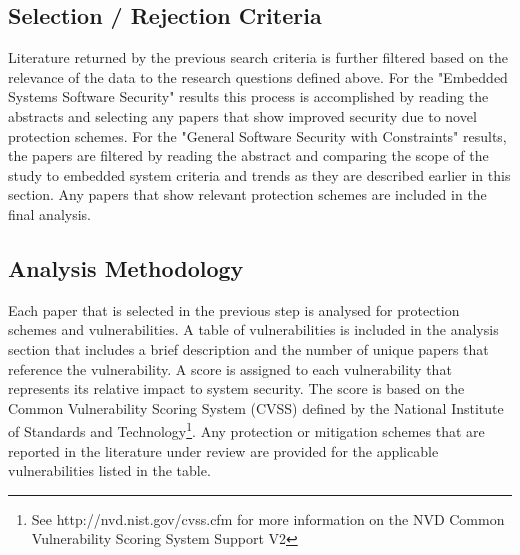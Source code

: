 \documentclass[final]{article}
\begin{document}
\subsection{Selection / Rejection Criteria}

Literature returned by the previous search criteria is further filtered based on the relevance of the data to the research questions defined above.  For the "Embedded Systems Software Security" results this process is accomplished by reading the abstracts and selecting any papers that show improved security due to novel protection schemes. For the "General Software Security with Constraints" results, the papers are filtered by reading the abstract and comparing the scope of the study to embedded system criteria and trends as they are described earlier in this section. Any papers that show relevant protection schemes are included in the final analysis.

\subsection{Analysis Methodology}

Each paper that is selected in the previous step is analysed for protection schemes and vulnerabilities.  A table of vulnerabilities is included in the analysis section that includes a brief description and the number of unique papers that reference the vulnerability. A score is assigned to each vulnerability that represents its relative impact to system security. The score is based on the Common Vulnerability Scoring System (CVSS) defined by the National Institute of Standards and Technology\footnote{See http://nvd.nist.gov/cvss.cfm for more information on the NVD Common Vulnerability Scoring System Support V2}.  Any protection or mitigation schemes that are reported in the literature under review are provided for the applicable vulnerabilities listed in the table.  


\end{document}
